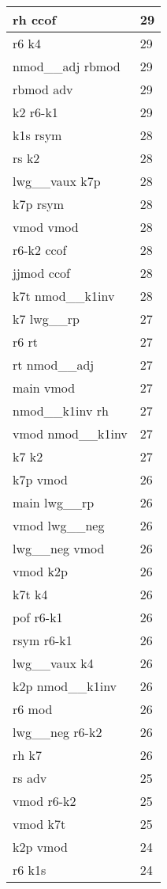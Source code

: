 \documentclass[a4 paper]{article}
\begin{document}
\begin{longtable}{p{}p{}}
rh ccof  & 29 \\ \midrule
r6 k4  & 29 \\ \midrule
nmod\_\_adj rbmod  & 29 \\ \midrule
rbmod adv  & 29 \\ \midrule
k2 r6-k1  & 29 \\ \midrule
k1s rsym  & 28 \\ \midrule
rs k2  & 28 \\ \midrule
lwg\_\_vaux k7p  & 28 \\ \midrule
k7p rsym  & 28 \\ \midrule
vmod vmod  & 28 \\ \midrule
r6-k2 ccof  & 28 \\ \midrule
jjmod ccof  & 28 \\ \midrule
k7t nmod\_\_k1inv  & 28 \\ \midrule
k7 lwg\_\_rp  & 27 \\ \midrule
r6 rt  & 27 \\ \midrule
rt nmod\_\_adj  & 27 \\ \midrule
main vmod  & 27 \\ \midrule
nmod\_\_k1inv rh  & 27 \\ \midrule
vmod nmod\_\_k1inv  & 27 \\ \midrule
k7 k2  & 27 \\ \midrule
k7p vmod  & 26 \\ \midrule
main lwg\_\_rp  & 26 \\ \midrule
vmod lwg\_\_neg  & 26 \\ \midrule
lwg\_\_neg vmod  & 26 \\ \midrule
vmod k2p  & 26 \\ \midrule
k7t k4  & 26 \\ \midrule
pof r6-k1  & 26 \\ \midrule
rsym r6-k1  & 26 \\ \midrule
lwg\_\_vaux k4  & 26 \\ \midrule
k2p nmod\_\_k1inv  & 26 \\ \midrule
r6 mod  & 26 \\ \midrule
lwg\_\_neg r6-k2  & 26 \\ \midrule
rh k7  & 26 \\ \midrule
rs adv  & 25 \\ \midrule
vmod r6-k2  & 25 \\ \midrule
vmod k7t  & 25 \\ \midrule
k2p vmod  & 24 \\ \midrule
r6 k1s  & 24 \\ \midrule

\end{longtable}
\end{document}
